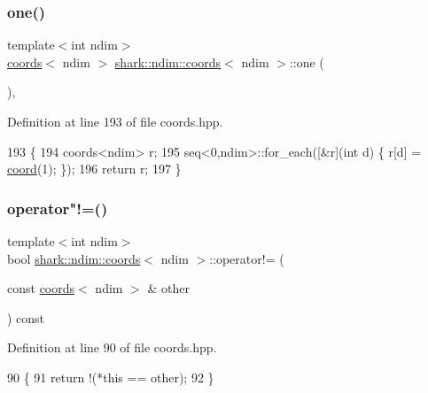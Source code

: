 \subsubsection{\texorpdfstring{one()}{one()}}
{\footnotesize\ttfamily template$<$int ndim$>$ \\
\hyperlink{structshark_1_1ndim_1_1coords}{coords}$<$ ndim $>$ \hyperlink{structshark_1_1ndim_1_1coords}{shark\+::ndim\+::coords}$<$ ndim $>$\+::one (\begin{DoxyParamCaption}{ }\end{DoxyParamCaption})\hspace{0.3cm}{\ttfamily [inline]}, {\ttfamily [static]}}



Definition at line 193 of file coords.\+hpp.


\begin{DoxyCode}
193                                               \{
194             coords<ndim> r;
195             seq<0,ndim>::for\_each([&r](\textcolor{keywordtype}{int} d) \{ r[d] = \hyperlink{namespaceshark_a767a92d5dd82cb82266473bff42fa6d9}{coord}(1); \});
196             \textcolor{keywordflow}{return} r;
197         \}
\end{DoxyCode}
\hypertarget{structshark_1_1ndim_1_1coords_af85a0dc03aefa526e583697f3db845cb}{}\label{structshark_1_1ndim_1_1coords_af85a0dc03aefa526e583697f3db845cb} 
\subsubsection{\texorpdfstring{operator"!=()}{operator!=()}}
{\footnotesize\ttfamily template$<$int ndim$>$ \\
bool \hyperlink{structshark_1_1ndim_1_1coords}{shark\+::ndim\+::coords}$<$ ndim $>$\+::operator!= (\begin{DoxyParamCaption}\item[{const \hyperlink{structshark_1_1ndim_1_1coords}{coords}$<$ ndim $>$ \&}]{other }\end{DoxyParamCaption}) const\hspace{0.3cm}{\ttfamily [inline]}}



Definition at line 90 of file coords.\+hpp.


\begin{DoxyCode}
90                                                                             \{
91             \textcolor{keywordflow}{return} !(*\textcolor{keyword}{this} == other);
92         \}
\end{DoxyCode}
\hypertarget{structshark_1_1ndim_1_1coords_a7ce7913d4233a7ec7697b69ac1023e10}{}\label{structshark_1_1ndim_1_1coords_a7ce7913d4233a7ec7697b69ac1023e10} 
